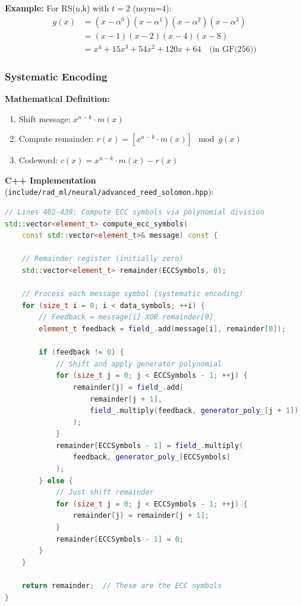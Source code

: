 \documentclass[11pt,a4paper]{article}
\begin{document}
\textbf{Example:} For RS(n,k) with $t=2$ (nsym=4):
\begin{align}
g(x) &= (x - \alpha^0)(x - \alpha^1)(x - \alpha^2)(x - \alpha^3) \\
&= (x - 1)(x - 2)(x - 4)(x - 8) \\
&= x^4 + 15x^3 + 54x^2 + 120x + 64 \quad \text{(in GF(256))}
\end{align}

\subsubsection{Systematic Encoding}

\textbf{Mathematical Definition:}
\begin{enumerate}
    \item Shift message: $x^{n-k} \cdot m(x)$
    \item Compute remainder: $r(x) = [x^{n-k} \cdot m(x)] \mod g(x)$
    \item Codeword: $c(x) = x^{n-k} \cdot m(x) - r(x)$
\end{enumerate}

\textbf{C++ Implementation} (\texttt{include/rad\_ml/neural/advanced\_reed\_solomon.hpp}):
\begin{lstlisting}[language=C++, basicstyle=\small\ttfamily]
// Lines 402-439: Compute ECC symbols via polynomial division
std::vector<element_t> compute_ecc_symbols(
    const std::vector<element_t>& message) const {

    // Remainder register (initially zero)
    std::vector<element_t> remainder(ECCSymbols, 0);

    // Process each message symbol (systematic encoding)
    for (size_t i = 0; i < data_symbols; ++i) {
        // Feedback = message[i] XOR remainder[0]
        element_t feedback = field_.add(message[i], remainder[0]);

        if (feedback != 0) {
            // Shift and apply generator polynomial
            for (size_t j = 0; j < ECCSymbols - 1; ++j) {
                remainder[j] = field_.add(
                    remainder[j + 1],
                    field_.multiply(feedback, generator_poly_[j + 1])
                );
            }
            remainder[ECCSymbols - 1] = field_.multiply(
                feedback, generator_poly_[ECCSymbols]
            );
        } else {
            // Just shift remainder
            for (size_t j = 0; j < ECCSymbols - 1; ++j) {
                remainder[j] = remainder[j + 1];
            }
            remainder[ECCSymbols - 1] = 0;
        }
    }

    return remainder;  // These are the ECC symbols
}
\end{lstlisting}
\end{document}
